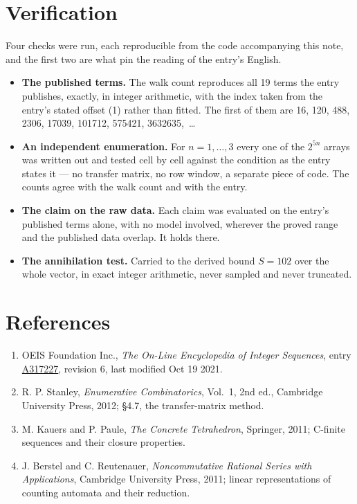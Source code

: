 \documentclass[11pt]{article}
\theoremstyle{definition}
\begin{document}
\section{Verification}

Four checks were run, each reproducible from the code accompanying this note, and the first two are what pin the reading of the entry's English.

\begin{itemize}

\item {\bfseries The published terms.} The walk count reproduces all 19 terms the entry publishes, exactly, in integer arithmetic, with the index taken from the entry's stated offset (1) rather than fitted. The first of them are 16, 120, 488, 2306, 17039, 101712, 575421, 3632635,~\dots

\item {\bfseries An independent enumeration.} For $n = 1,\dots,3$ every one of the $2^{5n}$ arrays was written out and tested cell by cell against the condition as the entry states it --- no transfer matrix, no row window, a separate piece of code. The counts agree with the walk count and with the entry.

\item {\bfseries The claim on the raw data.} Each claim was evaluated on the entry's published terms alone, with no model involved, wherever the proved range and the published data overlap. It holds there.

\item {\bfseries The annihilation test.} Carried to the derived bound $S = 102$ over the whole vector, in exact integer arithmetic, never sampled and never truncated.

\end{itemize}

\section{References}

\begin{enumerate}

\item OEIS Foundation Inc., \emph{The On-Line Encyclopedia of Integer Sequences}, entry \href{https://oeis.org/A317227}{A317227}, revision 6, last modified Oct 19 2021.

\item R. P. Stanley, \emph{Enumerative Combinatorics}, Vol.~1, 2nd ed., Cambridge University Press, 2012; \S4.7, the transfer-matrix method.

\item M. Kauers and P. Paule, \emph{The Concrete Tetrahedron}, Springer, 2011; C-finite sequences and their closure properties.

\item J. Berstel and C. Reutenauer, \emph{Noncommutative Rational Series with Applications}, Cambridge University Press, 2011; linear representations of counting automata and their reduction.

\end{enumerate}
\end{document}
